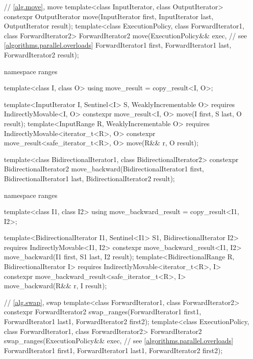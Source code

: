 \begin{codeblock}
{  // \ref{alg.move}, move
  template<class InputIterator, class OutputIterator>
    constexpr OutputIterator move(InputIterator first, InputIterator last,
                                  OutputIterator result);
  template<class ExecutionPolicy, class ForwardIterator1,
           class ForwardIterator2>
    ForwardIterator2 move(ExecutionPolicy&& exec, // see \ref{algorithms.parallel.overloads}
                          ForwardIterator1 first, ForwardIterator1 last,
                          ForwardIterator2 result);

  namespace ranges {
    template<class I, class O>
    using move_result = copy_result<I, O>;

    template<InputIterator I, Sentinel<I> S, WeaklyIncrementable O>
      requires IndirectlyMovable<I, O>
      constexpr move_result<I, O>
        move(I first, S last, O result);
    template<InputRange R, WeaklyIncrementable O>
      requires IndirectlyMovable<iterator_t<R>, O>
      constexpr move_result<safe_iterator_t<R>, O>
        move(R&& r, O result);
  }

  template<class BidirectionalIterator1, class BidirectionalIterator2>
    constexpr BidirectionalIterator2
      move_backward(BidirectionalIterator1 first, BidirectionalIterator1 last,
                    BidirectionalIterator2 result);

  namespace ranges {
    template<class I1, class I2>
    using move_backward_result = copy_result<I1, I2>;

    template<BidirectionalIterator I1, Sentinel<I1> S1, BidirectionalIterator I2>
      requires IndirectlyMovable<I1, I2>
      constexpr move_backward_result<I1, I2>
        move_backward(I1 first, S1 last, I2 result);
    template<BidirectionalRange R, BidirectionalIterator I>
      requires IndirectlyMovable<iterator_t<R>, I>
      constexpr move_backward_result<safe_iterator_t<R>, I>
        move_backward(R&& r, I result);
  }

  // \ref{alg.swap}, swap
  template<class ForwardIterator1, class ForwardIterator2>
    constexpr ForwardIterator2 swap_ranges(ForwardIterator1 first1, ForwardIterator1 last1,
                                           ForwardIterator2 first2);
  template<class ExecutionPolicy, class ForwardIterator1, class ForwardIterator2>
    ForwardIterator2 swap_ranges(ExecutionPolicy&& exec, // see \ref{algorithms.parallel.overloads}
                                 ForwardIterator1 first1, ForwardIterator1 last1,
                                 ForwardIterator2 first2);

}
\end{codeblock}
